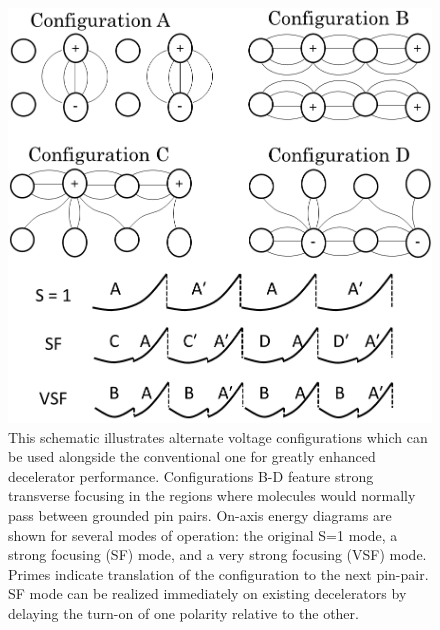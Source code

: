 \documentclass[%
 reprint,
 amsmath,amssymb,
 aps,
pra,
]{revtex4-1}
\begin{document}
\begin{figure}[t]
\includegraphics[width=\linewidth]{chargecartoon.png}%
\caption{
This schematic illustrates alternate voltage configurations which can be used alongside the conventional one for greatly enhanced decelerator performance. Configurations B-D feature strong transverse focusing in the regions where molecules would normally pass between grounded pin pairs. On-axis energy diagrams are shown for several modes of operation: the original S=1 mode, a strong focusing (SF) mode, and a very strong focusing (VSF) mode. Primes indicate translation of the configuration to the next pin-pair. SF mode can be realized immediately on existing decelerators by delaying the turn-on of one polarity relative to the other.
}
\label{fig:speedvary}
\end{figure}
\end{document}
